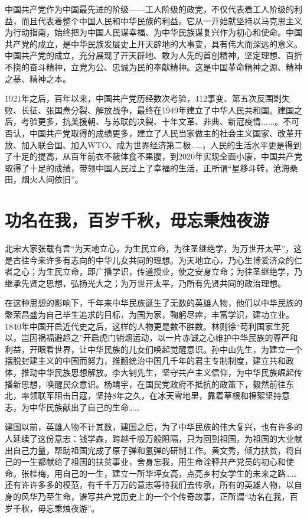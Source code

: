 \documentclass[12pt,a4paper]{ctexart}
\begin{document}
​中国共产党作为中国最先进的阶级——工人阶级的政党，不仅代表着工人阶级的利益，而且代表着整个中国人民和中华民族的利益。它从一开始就坚持以马克思主义为行动指南，始终把为中国人民谋幸福、为中华民族谋复兴作为初心和使命。中国共产党的成立，是中华民族发展史上开天辟地的大事变，具有伟大而深远的意义。中国共产党的成立，充分展现了开天辟地、敢为人先的首创精神，坚定理想、百折不挠的奋斗精神，立党为公、忠诚为民的奉献精神。这是中国革命精神之源、精神之基、精神之本。

​1921年之后，百年以来，中国共产党历经数次考验，412事变、第五次反围剿失败、长征、张国焘分裂、解放战争，最终在1949年建立了中华人民共和国。建国之后，考验更多，抗美援朝、与苏联的决裂、十年文革、非典、新冠疫情......。不可否认，中国共产党取得的成绩更多，建立了人民当家做主的社会主义国家、改革开放、加入联合国、加入WTO、成为世界经济第二极……，人民的生活水平更是得到了十足的提高，从百年前衣不蔽体食不果腹，到2020年实现全面小康，中国共产党取得了十足的成绩，带领中国人民过上了幸福的生活，正所谓“星移斗转，沧海桑田，烟火人间依旧”。
\section{\textbf{\Large{功名在我，百岁千秋，毋忘秉烛夜游}}}
北宋大家张载有言“为天地立心，为生民立命，为往圣继绝学，为万世开太平”，这是古往今来许多有志向的中华儿女共同的理想。为天地立心，乃心生博爱济众的仁者之心；为生民立命，即广播学识，传道授业，使之安身立命；为往圣继绝学，乃继承先贤之思想，弘扬光大之；为万世开太平，乃所有先贤共同的政治理想。

​在这种思想的影响下，千年来中华民族诞生了无数的英雄人物，他们以中华民族的繁荣昌盛为自己毕生追求的目标，为国为家，鞠躬尽瘁，丰富学识，建功立业。1840年中国开启近代史之后，这样的人物更是数不胜数。林则徐“苟利国家生死以，岂因祸福避趋之”开启虎门销烟运动，以一片赤诚之心维护中华民族的尊严和利益，开眼看世界，让中华民族的儿女们唤起觉醒意识。孙中山先生，为建立一个摆脱封建主义的中国而努力，推翻统治中国几千年的君主专制制度，建立共和政体，推动中华民族思想解放。李大钊先生，坚守共产主义信仰，为中华民族崛起传播新思想，唤醒民众意识。杨靖宇，在国民党政府不抵抗的政策下，毅然前往东北，率领联军阻击日寇，坚持8年之久，在冰天雪地里，靠着草根和棉絮坚持意志，为中华民族献出了自己的生命……

​建国以前，英雄人物不计其数，建国之后，为了中华民族的伟大复兴，也有许多的人延续了这份意志：钱学森，跨越千般万般阻隔，只为回到祖国，为祖国的大业献出自己力量，帮助祖国完成了原子弹和氢弹的研制工作。黄文秀，倾力扶贫，将自己的一生都献给了祖国的扶贫事业，舍身忘我，用生命诠释共产党员的初心和使命。张桂梅，用自己的一生，建立一所华坪女高，点亮乡村女学生的未来之路……还有许许多多的模范，有千千万万的意志等待我们去传承，所有的英雄人物，以自身的风华乃至生命，谱写共产党历史上的一个个传奇故事，正所谓“功名在我，百岁千秋，毋忘秉烛夜游”。
\end{document}
